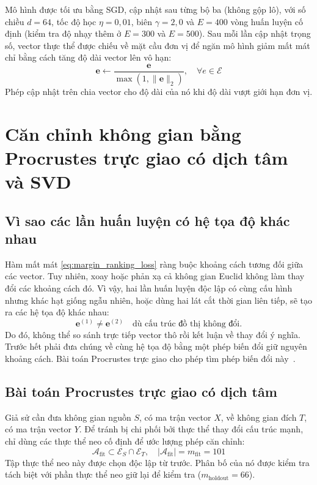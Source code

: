 Mô hình được tối ưu bằng SGD, cập nhật sau từng bộ ba (không gộp lô), với số chiều $d = 64$, tốc độ học $\eta = 0{,}01$, biên $\gamma = 2{,}0$ và $E = 400$ vòng huấn luyện cố định (kiểm tra độ nhạy thêm ở $E = 300$ và $E = 500$). Sau mỗi lần cập nhật trọng số, vector thực thể được chiếu về mặt cầu đơn vị để ngăn mô hình giảm mất mát chỉ bằng cách tăng độ dài vector lên vô hạn:
\begin{equation}
\mathbf{e} \leftarrow \frac{\mathbf{e}}{\max\left(1, \|\mathbf{e}\|_2\right)}, \quad \forall e \in \mathcal{E}
\end{equation}
Phép cập nhật trên chia vector cho độ dài của nó khi độ dài vượt giới hạn đơn vị.
\section{Căn chỉnh không gian bằng Procrustes trực giao có dịch tâm và SVD}
\label{sec:procrustes_alignment}

\subsection{Vì sao các lần huấn luyện có hệ tọa độ khác nhau}
Hàm mất mát \eqref{eq:margin_ranking_loss} ràng buộc khoảng cách tương đối giữa các vector. Tuy nhiên, xoay hoặc phản xạ cả không gian Euclid không làm thay đổi các khoảng cách đó. Vì vậy, hai lần huấn luyện độc lập có cùng cấu hình nhưng khác hạt giống ngẫu nhiên, hoặc dùng hai lát cắt thời gian liên tiếp, sẽ tạo ra các hệ tọa độ khác nhau:
\begin{equation}
\mathbf{e}^{(1)} \neq \mathbf{e}^{(2)} \quad \text{dù cấu trúc đồ thị không đổi.}
\end{equation}
Do đó, không thể so sánh trực tiếp vector thô rồi kết luận về thay đổi ý nghĩa. Trước hết phải đưa chúng về cùng hệ tọa độ bằng một phép biến đổi giữ nguyên khoảng cách. Bài toán Procrustes trực giao cho phép tìm phép biến đổi này~\cite{schonemann1966generalized}.

\subsection{Bài toán Procrustes trực giao có dịch tâm}
Giả sử cần đưa không gian nguồn $S$, có ma trận vector $X$, về không gian đích $T$, có ma trận vector $Y$. Để tránh bị chi phối bởi thực thể thay đổi cấu trúc mạnh, chỉ dùng các thực thể neo cố định để ước lượng phép căn chỉnh:
\begin{equation}
\mathcal{A}_{\text{fit}} \subset \mathcal{E}_S \cap \mathcal{E}_T, \quad |\mathcal{A}_{\text{fit}}| = m_{\text{fit}} = 101
\end{equation}
Tập thực thể neo này được chọn độc lập từ trước. Phân bố của nó được kiểm tra tách biệt với phần thực thể neo giữ lại để kiểm tra ($m_{\text{holdout}} = 66$).

